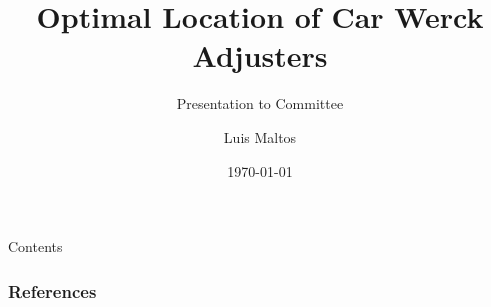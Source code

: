 \documentclass[10pt,usenames,dvipsnames,svgnames,table]{beamer}
\title{Optimal Location of Car Werck Adjusters}
\subtitle{Presentation to Committee}
\author{Luis Maltos}
\institute[PISIS]{
  Posgrado en Ingenier\'a de Sistemas \\
  FIME / UANL}
\date[Sinodales]{\today}
\begin{document}
\begin{frame}
  \titlepage
\end{frame}

\begin{frame}{Contents}
  \tableofcontents
\end{frame}







\begin{frame}[allowframebreaks]
  \frametitle{References}
  {\scriptsize
    
    
  }
\end{frame}
\end{document}
